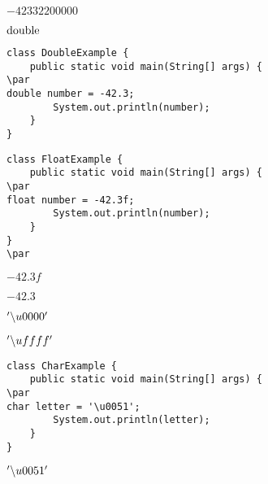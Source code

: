 \documentclass{book}
\def\lthtmlcheckvsize{\ifdim\ht\sizebox<\vsize 
  \ifdim\wd\sizebox<\hsize\expandafter\hfill\fi \expandafter\vfill
  \else\expandafter\vss\fi}%
\begin{document}
{\newpage\clearpage
{}%
$-42332200000$%
\lthtmlindisplaymathZ
\lthtmlcheckvsize\clearpage}

{\newpage\clearpage
{}%
$\lstinline{double}$%
\lthtmlindisplaymathZ
\lthtmlcheckvsize\clearpage}

{\newpage\clearpage
{}%
\begin{lstlisting}
class DoubleExample {
    public static void main(String[] args) {
\par
double number = -42.3;
        System.out.println(number);
    }
}
\end{lstlisting}%
\lthtmlfigureZ
\lthtmlcheckvsize\clearpage}

{\newpage\clearpage
{}%
\begin{lstlisting}
class FloatExample {
    public static void main(String[] args) {
\par
float number = -42.3f;
        System.out.println(number);
    }
}
\par
\end{lstlisting}%
\lthtmlfigureZ
\lthtmlcheckvsize\clearpage}

{\newpage\clearpage
{}%
$-42.3f$%
\lthtmlindisplaymathZ
\lthtmlcheckvsize\clearpage}

{\newpage\clearpage
{}%
$-42.3$%
\lthtmlindisplaymathZ
\lthtmlcheckvsize\clearpage}

{\newpage\clearpage
{}%
$'\symbol{92}u0000'$%
\lthtmlindisplaymathZ
\lthtmlcheckvsize\clearpage}

{\newpage\clearpage
{}%
$'\symbol{92}uffff'$%
\lthtmlindisplaymathZ
\lthtmlcheckvsize\clearpage}

{\newpage\clearpage
{}%
\begin{lstlisting}
class CharExample {
    public static void main(String[] args) {
\par
char letter = '\u0051';
        System.out.println(letter);
    }
}
\end{lstlisting}%
\lthtmlfigureZ
\lthtmlcheckvsize\clearpage}

{\newpage\clearpage
{}%
$'\symbol{92}u0051'$%
\lthtmlindisplaymathZ
\lthtmlcheckvsize\clearpage}
\end{document}
